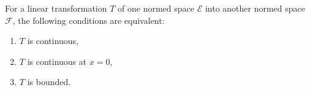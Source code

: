 For a linear transformation $T$ of one normed space $\mathcal{E}$ into another normed space $\mathcal{F}$, the following conditions are equivalent:

\begin{enumerate}
\item[(i)] $T$ is continuous,
\item[(ii)] $T$ is continuous at $x = 0$,
\item[(iii)] $T$ is bounded.
\end{enumerate}
